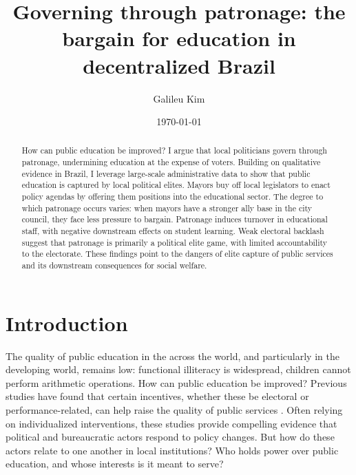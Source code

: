 \documentclass[12pt,a4paper]{article}
\title{Governing through patronage: the bargain for education in decentralized Brazil}
\date{\today}
\author{Galileu Kim}
\affil{Princeton University}
\begin{document}
\maketitle

\begin{abstract}
    How can public education be improved? I argue that local politicians govern through patronage, undermining education at the expense of voters. Building on qualitative evidence in Brazil, I leverage large-scale administrative data to show that public education is captured by local political elites. Mayors buy off local legislators to enact policy agendas by offering them positions into the educational sector. The degree to which patronage occurs varies: when mayors have a stronger ally base in the city council, they face less pressure to bargain. Patronage induces turnover in educational staff, with negative downstream effects on student learning. Weak electoral backlash suggest that patronage is primarily a political elite game, with limited accountability to the electorate. These findings point to the dangers of elite capture of public services and its downstream consequences for social welfare.
\end{abstract}

\newpage
\section{Introduction}


The quality of public education in the across the world, and particularly in the developing world, remains low: functional illiteracy is widespread, children cannot perform arithmetic operations. How can public education be improved? Previous studies have found that certain incentives, whether these be electoral or performance-related, can help raise the quality of public services \citep{gulzar_politicians_2017,duflo_incentives_2012}. Often relying on individualized interventions, these studies provide compelling evidence that political and bureaucratic actors respond to policy changes.\citep{finan_personnel_2015} But how do these actors relate to one another in local institutions? Who holds power over public education, and whose interests is it meant to serve?
\end{document}
